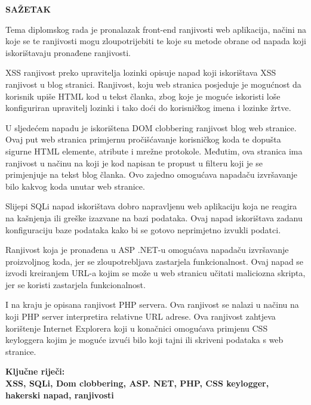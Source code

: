 
\newpage
\setlength{\parindent}{0in}
{\fontsize{14}{18}\bf {SAŽETAK}}

\vskip 15mm
   
\textnormal{
Tema diplomskog rada je pronalazak front-end ranjivosti web aplikacija, načini na koje se te ranjivosti mogu zloupotrijebiti te koje su metode obrane od napada koji iskorištavaju pronađene ranjivosti. }

\textnormal{
XSS ranjivost preko upravitelja lozinki opisuje napad koji iskorištava XSS ranjivost u blog stranici. Ranjivost, koju web stranica posjeduje je mogućnost da korisnik upiše HTML kod u tekst članka, zbog koje je moguće iskoristi loše konfiguriran upravitelj lozinki i tako doći do korisničkog imena i lozinke žrtve.}

\textnormal{
U sljedećem napadu je iskorištena DOM clobbering ranjivost blog web stranice. Ovaj put web stranica primjernu pročišćavanje korisničkog koda te dopušta sigurne HTML elemente, atribute i mrežne protokole. Međutim, ova stranica ima ranjivost u načinu na koji je kod napisan te propust u filteru koji je se primjenjuje na tekst blog članka. Ovo zajedno omogućava napadaču izvršavanje bilo kakvog koda unutar web stranice.}

\textnormal{
Slijepi SQLi napad iskorištava dobro napravljenu web aplikaciju koja ne reagira na kašnjenja ili greške izazvane na bazi podataka. Ovaj napad iskorištava zadanu konfiguraciju baze podataka kako bi se gotovo neprimjetno izvukli podatci.}

\textnormal{
Ranjivost koja je pronađena u ASP .NET-u omogućava napadaču izvršavanje proizvoljnog koda, jer se zloupotrebljava zastarjela funkcionalnost. Ovaj napad se izvodi kreiranjem URL-a kojim se može u web stranicu učitati maliciozna skripta, jer se koristi zastarjela funkcionalnost.}

\textnormal{
I na kraju je opisana ranjivost PHP servera. Ova ranjivost se nalazi u načinu na koji PHP server interpretira relativne URL adrese. Ova ranjivost zahtjeva korištenje Internet Explorera koji u konačnici omogućava primjenu CSS keyloggera kojim je moguće izvući bilo koji tajni ili skriveni podataka s web stranice.}


\vskip 15mm
\bf{Ključne riječi:\\}
\textnormal{XSS, SQLi, Dom clobbering, ASP. NET, PHP, CSS keylogger, hakerski napad, ranjivosti}


